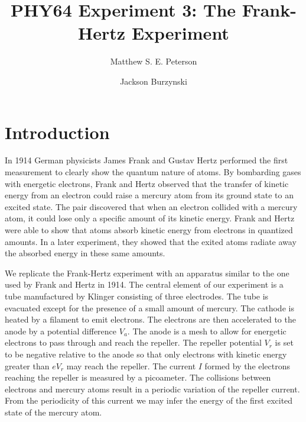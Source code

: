 \documentclass[aps, reprint,amsmath,amssymb]{revtex4-1} %
\begin{document}
\title{PHY64 Experiment 3: The Frank-Hertz Experiment}
\author{Matthew S. E. Peterson}
\author{Jackson Burzynski}
\maketitle

\section{Introduction}
In 1914 German physicists James Frank and Gustav Hertz performed the first measurement to clearly show the quantum nature of atoms. By bombarding gases with energetic electrons, Frank and Hertz observed that the transfer of kinetic energy from an electron could raise a mercury atom from its ground state to an excited state. The pair discovered that when an electron collided with a mercury atom, it could lose only a specific amount of its kinetic energy. Frank and Hertz were able to show that atoms absorb kinetic energy from electrons in quantized amounts. In a later experiment, they showed that the exited atoms radiate away the absorbed energy in these same amounts.

We replicate the Frank-Hertz experiment with an apparatus similar to the one used by Frank and Hertz in 1914. The central element of our experiment is a tube manufactured by Klinger consisting of three electrodes. The tube is evacuated except for the presence of a small amount of mercury. The cathode is heated by a filament to emit electrons. The electrons are then accelerated to the anode by a potential difference $V_a$. The anode is a mesh to allow for energetic electrons to pass through and reach the repeller. The repeller potential $V_r$ is set to be negative relative to the anode so that only electrons with kinetic energy greater than $eV_r$ may reach the repeller. The current $I$ formed by the electrons reaching the repeller is measured by a picoameter. The collisions between electrons and mercury atoms result in a periodic variation of the repeller current. From the periodicity of this current we may infer the energy of the first excited state of the mercury atom.
\end{document}

